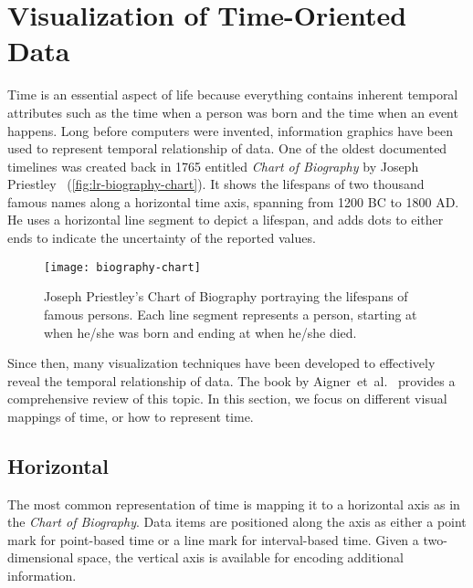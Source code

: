 \section{Visualization of Time-Oriented Data}
\label{sub:lr-time}
Time is an essential aspect of life because everything contains inherent temporal attributes such as the time when a person was born and the time when an event happens. Long before computers were invented, information graphics have been used to represent temporal relationship of data. One of the oldest documented timelines was created back in 1765 entitled \emph{Chart of Biography} by Joseph Priestley~\cite{Priestley1765} (\autoref{fig:lr-biography-chart}). It shows the lifespans of two thousand famous names along a horizontal time axis, spanning from 1200 BC to 1800 AD. He uses a horizontal line segment to depict a lifespan, and adds dots to either ends to indicate the uncertainty of the reported values. 

\begin{figure}[!htb]
	\centering
	\texttt{[image: biography-chart]}
	\caption{Joseph Priestley's Chart of Biography portraying the lifespans of famous persons. Each line segment represents a person, starting at when he/she was born and ending at when he/she died. }
	\label{fig:lr-biography-chart}
\end{figure}

Since then, many visualization techniques have been developed to effectively reveal the temporal relationship of data. The book by Aigner~et~al.~\cite{Aigner2011} provides a comprehensive review of this topic. In this section, we focus on different visual mappings of time, or how to represent time.

\subsection{Horizontal}
The most common representation of time is mapping it to a horizontal axis as in the \emph{Chart of Biography}. Data items are positioned along the axis as either a point mark for point-based time or a line mark for interval-based time. Given a two-dimensional space, the vertical axis is available for encoding additional information.

